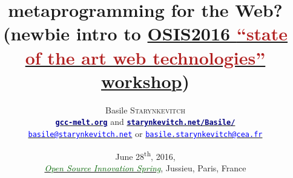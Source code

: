 \documentclass[xcolor=svgnames,final,smaller,a4]{beamer}
\newcommand{\monbric}[1]{\textcolor{FireBrick}{\textbf{#1}}}
\begin{document}
\title[metaprogramming for the Web?]{metaprogramming for the Web? \\
  \vspace{0.2cm}
  \small{(newbie intro to \href{http://www.open-source-innovation-spring.org/techniques-de-programmation-web-letat-de-lart-date-conf/}{OSIS2016 \monbric{``state of the art web technologies''} workshop})}}
\author[Basile Starynkevitch]{Basile \textsc{Starynkevitch} \\
\href{http://gcc-melt.org/}{\textcolor{Navy}{\bf\texttt{\large gcc-melt.org}}} and \href{http://starynkevitch.net/Basile/}{\textcolor{Navy}{\bf\texttt{starynkevitch.net/Basile/}}} \\
\href{mailto:basile@starynkevitch.net}{\textcolor{Blue}{\texttt{basile@starynkevitch.net}}} 
  or
  \href{mailto:basile.starynkevitch@cea.fr}{\textcolor{Blue}{\texttt{basile.starynkevitch@cea.fr}}}}


\date[June 28\textsuperscript{th}, 2016 ~ (OSIS2016)]%
{\small June 28\textsuperscript{th}, 2016, \\
  \href{http://www.open-source-innovation-spring.org}{\textcolor{DarkGreen}{\emph{Open Source Innovation Spring}}}, Jussieu, Paris, France}

\begin{frame}
  \maketitle
  
\end{frame}
\end{document}
